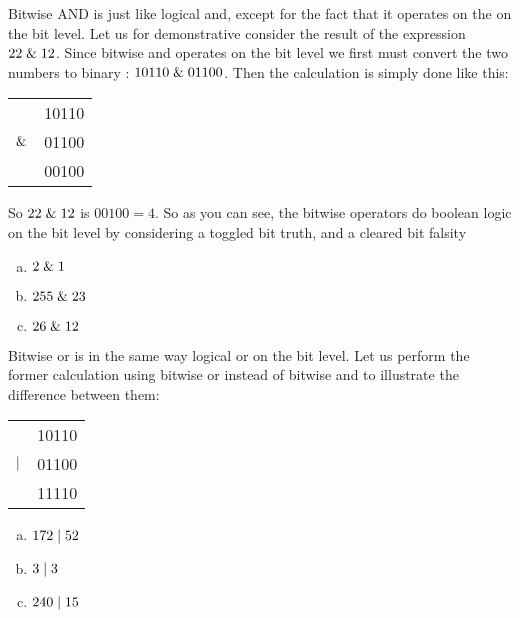 Bitwise AND is just like logical and, except for the fact that it
operates on the on the bit level. Let us for demonstrative consider
the result of the expression $22 \mathrel{\&} 12$. Since bitwise and
operates on the bit level we first must convert the two numbers to
binary : $10110 \mathrel{\&} 01100$. Then the calculation is simply done
like this:

\begin{center}
  \begin{tabular}{lr}
    & 10110  \\
    $\mathrel{\&}$ & 01100 \\
    \hline
    & 00100 \\
  \end{tabular}
\end{center}

So $22 \mathrel{\&} 12$ is $00100=4$. So as you can see, the bitwise
operators do boolean logic on the bit level by considering a toggled
bit truth, and a cleared bit falsity

\begin{Exercise}[label={bitand}]

  \begin{enumerate}[(a)]
  \item $2 \mathrel{\&} 1$
  \item $255 \mathrel{\&} 23$
  \item $26 \mathrel{\&} 12$
  \end{enumerate}
\end{Exercise}

Bitwise or is in the same way logical or on the bit level. Let us
perform the former calculation using bitwise or instead of bitwise and
to illustrate the difference between them:

\begin{center}
  \begin{tabular}{lr}
    & 10110  \\
    $\mathrel{|}$ & 01100 \\
    \hline
    & 11110 \\
  \end{tabular}
\end{center}

\begin{Exercise}[label={bitor}]
  \begin{enumerate}[(a)]
  \item $172 \mathrel{|} 52$
  \item $3 \mathrel{|} 3$
  \item $240 \mathrel{|} 15$
  \end{enumerate}
\end{Exercise}

